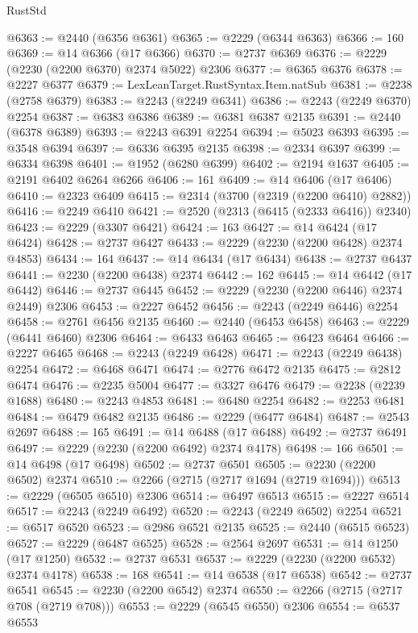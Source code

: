 \begin{lexlean}{RustStd}
\begin{coremodule}
@6363 := @2440 (@6356 @6361)
@6365 := @2229 (@6344 @6363)
@6366 := 160
@6369 := @14 @6366 (@17 @6366)
@6370 := @2737 @6369
@6376 := @2229 (@2230 (@2200 @6370) @2374 @5022) @2306
@6377 := @6365 @6376
@6378 := @2227 @6377
@6379 := LexLeanTarget.RustSyntax.Item.natSub
@6381 := @2238 (@2758 @6379)
@6383 := @2243 (@2249 @6341)
@6386 := @2243 (@2249 @6370) @2254
@6387 := @6383 @6386
@6389 := @6381 @6387 @2135
@6391 := @2440 (@6378 @6389)
@6393 := @2243 @6391 @2254
@6394 := @5023 @6393
@6395 := @3548 @6394
@6397 := @6336 @6395 @2135
@6398 := @2334 @6397
@6399 := @6334 @6398
@6401 := @1952 (@6280 @6399)
@6402 := @2194 @1637
@6405 := @2191 @6402 @6264 @6266
@6406 := 161
@6409 := @14 @6406 (@17 @6406)
@6410 := @2323 @6409
@6415 := @2314 (@3700 (@2319 (@2200 @6410) @2882))
@6416 := @2249 @6410
@6421 := @2520 (@2313 (@6415 (@2333 @6416)) @2340)
@6423 := @2229 (@3307 @6421)
@6424 := 163
@6427 := @14 @6424 (@17 @6424)
@6428 := @2737 @6427
@6433 := @2229 (@2230 (@2200 @6428) @2374 @4853)
@6434 := 164
@6437 := @14 @6434 (@17 @6434)
@6438 := @2737 @6437
@6441 := @2230 (@2200 @6438) @2374
@6442 := 162
@6445 := @14 @6442 (@17 @6442)
@6446 := @2737 @6445
@6452 := @2229 (@2230 (@2200 @6446) @2374 @2449) @2306
@6453 := @2227 @6452
@6456 := @2243 (@2249 @6446) @2254
@6458 := @2761 @6456 @2135
@6460 := @2440 (@6453 @6458)
@6463 := @2229 (@6441 @6460) @2306
@6464 := @6433 @6463
@6465 := @6423 @6464
@6466 := @2227 @6465
@6468 := @2243 (@2249 @6428)
@6471 := @2243 (@2249 @6438) @2254
@6472 := @6468 @6471
@6474 := @2776 @6472 @2135
@6475 := @2812 @6474
@6476 := @2235 @5004
@6477 := @3327 @6476
@6479 := @2238 (@2239 @1688)
@6480 := @2243 @4853
@6481 := @6480 @2254
@6482 := @2253 @6481
@6484 := @6479 @6482 @2135
@6486 := @2229 (@6477 @6484)
@6487 := @2543 @2697
@6488 := 165
@6491 := @14 @6488 (@17 @6488)
@6492 := @2737 @6491
@6497 := @2229 (@2230 (@2200 @6492) @2374 @4178)
@6498 := 166
@6501 := @14 @6498 (@17 @6498)
@6502 := @2737 @6501
@6505 := @2230 (@2200 @6502) @2374
@6510 := @2266 (@2715 (@2717 @1694 (@2719 @1694)))
@6513 := @2229 (@6505 @6510) @2306
@6514 := @6497 @6513
@6515 := @2227 @6514
@6517 := @2243 (@2249 @6492)
@6520 := @2243 (@2249 @6502) @2254
@6521 := @6517 @6520
@6523 := @2986 @6521 @2135
@6525 := @2440 (@6515 @6523)
@6527 := @2229 (@6487 @6525)
@6528 := @2564 @2697
@6531 := @14 @1250 (@17 @1250)
@6532 := @2737 @6531
@6537 := @2229 (@2230 (@2200 @6532) @2374 @4178)
@6538 := 168
@6541 := @14 @6538 (@17 @6538)
@6542 := @2737 @6541
@6545 := @2230 (@2200 @6542) @2374
@6550 := @2266 (@2715 (@2717 @708 (@2719 @708)))
@6553 := @2229 (@6545 @6550) @2306
@6554 := @6537 @6553

\end{coremodule}
\end{lexlean}
